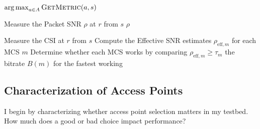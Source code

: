 \begin{algorithm}[tp]
\caption{\label{alg:ap_sel_basic}}
\begin{algorithmic}[1]
\RETURN $\operatorname*{arg\,max}_{a\in A} \textsc{GetMetric}(a, s)$ \hfill {}
\end{algorithmic}
\end{algorithm}
\begin{algorithm}[tp]
\caption{\label{alg:snr_link_metric}}
\begin{algorithmic}[1]
\STATE Measure the Packet SNR $\rho$ at $r$ from $s$
\RETURN $\rho$
\end{algorithmic}
\end{algorithm}
\begin{algorithm}[tp]
\caption{\label{alg:eff_snr_link_metric}}
\begin{algorithmic}[1]
\STATE Measure the CSI at $r$ from $s$ \hfill {}
\STATE Compute the Effective SNR estimates $\rho_{\text{eff},m}$ for each MCS $m$
\STATE Determine whether each MCS works by comparing $\rho_{\text{eff},m} \geq \tau_m$
\RETURN the bitrate $B(m)$ for the fastest working 
\end{algorithmic}
\end{algorithm}

\subsection{Characterization of Access Points}
I begin by characterizing whether access point selection matters in my testbed. How much does a good or bad choice impact performance?


